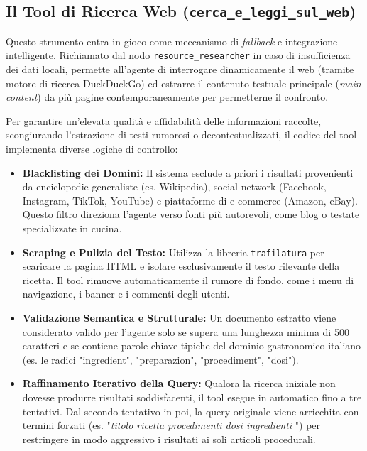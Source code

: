 \documentclass[11pt, a4paper]{article}
\begin{document}
\subsection{Il Tool di Ricerca Web (\texttt{cerca\_e\_leggi\_sul\_web})}

Questo strumento entra in gioco come meccanismo di \textit{fallback} e integrazione intelligente. Richiamato dal nodo \texttt{resource\_researcher} in caso di insufficienza dei dati locali, permette all'agente di interrogare dinamicamente il web (tramite motore di ricerca DuckDuckGo) ed estrarre il contenuto testuale principale (\textit{main content}) da più pagine contemporaneamente per permetterne il confronto.

Per garantire un'elevata qualità e affidabilità delle informazioni raccolte, scongiurando l'estrazione di testi rumorosi o decontestualizzati, il codice del tool implementa diverse logiche di controllo:

\begin{itemize}
    \item \textbf{Blacklisting dei Domini:} Il sistema esclude a priori i risultati provenienti da enciclopedie generaliste (es. Wikipedia), social network (Facebook, Instagram, TikTok, YouTube) e piattaforme di e-commerce (Amazon, eBay). Questo filtro direziona l'agente verso fonti più autorevoli, come blog o testate specializzate in cucina.
    \item \textbf{Scraping e Pulizia del Testo:} Utilizza la libreria \texttt{trafilatura} per scaricare la pagina HTML e isolare esclusivamente il testo rilevante della ricetta. Il tool rimuove automaticamente il rumore di fondo, come i menu di navigazione, i banner e i commenti degli utenti.
    \item \textbf{Validazione Semantica e Strutturale:} Un documento estratto viene considerato valido per l'agente solo se supera una lunghezza minima di 500 caratteri e se contiene parole chiave tipiche del dominio gastronomico italiano (es. le radici "ingredient", "preparazion", "procediment", "dosi").
    \item \textbf{Raffinamento Iterativo della Query:} Qualora la ricerca iniziale non dovesse produrre risultati soddisfacenti, il tool esegue in automatico fino a tre tentativi. Dal secondo tentativo in poi, la query originale viene arricchita con termini forzati (es. "\textit{titolo ricetta procedimenti dosi ingredienti }") per restringere in modo aggressivo i risultati ai soli articoli procedurali.
\end{itemize}
\end{document}
